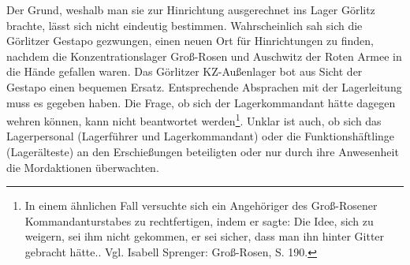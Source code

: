 \documentclass[a4paper,12pt,ngerman,
]{nisebook}
\begin{document}
Der Grund, weshalb man sie zur Hinrichtung ausgerechnet ins Lager Görlitz brachte, lässt sich nicht eindeutig bestimmen. Wahrscheinlich sah sich die Görlitzer Gestapo gezwungen, einen neuen Ort für Hinrichtungen zu finden, nachdem die Konzentrationslager Groß-Rosen und Auschwitz der Roten Armee in die Hände gefallen waren. Das Görlitzer KZ-Außenlager bot aus Sicht der Gestapo einen bequemen Ersatz. Entsprechende Absprachen mit der Lagerleitung muss es gegeben haben. Die Frage, ob sich der Lagerkommandant hätte dagegen wehren können, kann nicht beantwortet werden\footnote{In einem ähnlichen Fall versuchte sich ein Angehöriger des Groß-Rosener Kommandanturstabes zu rechtfertigen, indem er sagte: \glqq Die Idee, sich zu weigern, sei ihm nicht gekommen, er sei sicher, dass man ihn hinter Gitter gebracht hätte.\grqq. Vgl. Isabell Sprenger: Groß-Rosen, S. 190.}. Unklar ist auch, ob sich das Lagerpersonal (Lagerführer und Lagerkommandant) oder die Funktionshäftlinge (Lagerälteste) an den Erschießungen beteiligten oder nur durch ihre Anwesenheit die Mordaktionen überwachten.
\newline
\end{document}
